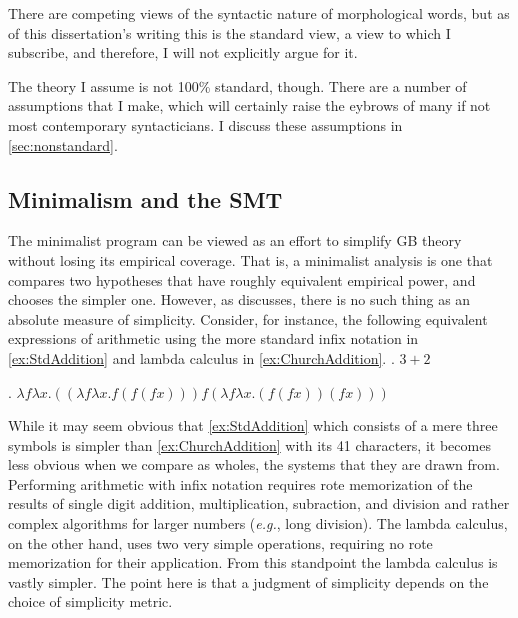 \documentclass[MilwayThesis]{subfiles}
\begin{document}
There are competing views of the syntactic nature of morphological words, but as of this dissertation's writing this is the standard view, a view to which I subscribe, and therefore, I will not explicitly argue for it.

The theory I assume is not 100\% standard, though.
There are a number of assumptions that I make, which will certainly raise the eybrows of many if not most contemporary syntacticians.
I discuss these assumptions in \cref{sec:nonstandard}.

\subsection{Minimalism and the SMT}
The minimalist program can be viewed as an effort to simplify GB theory without losing its empirical coverage.
That is, a minimalist analysis is one that compares two hypotheses that have roughly equivalent empirical power, and chooses the simpler one.
However, as \textcite{chomsky1965aspects} discusses, there is no such thing as an absolute measure of simplicity.
Consider, for instance, the following equivalent expressions of arithmetic using the more standard infix notation in \cref{ex:StdAddition} and lambda calculus in \cref{ex:ChurchAddition}.
\ex.\label{ex:StdAddition} $3 + 2$

\ex.\label{ex:ChurchAddition} $\lambda f \lambda x . ((\lambda f \lambda x . f(f(f x))) f(\lambda f \lambda x . (f(f x))(f x)))$

While it may seem obvious that \cref{ex:StdAddition} which consists of a mere three symbols is simpler than \cref{ex:ChurchAddition} with its 41 characters, it becomes less obvious when we compare as wholes, the systems that they are drawn from.
Performing arithmetic with infix notation requires rote memorization of the results of single digit addition, multiplication, subraction, and division and rather complex algorithms for larger numbers (\textit{e.g.}, long division).
The lambda calculus, on the other hand, uses two very simple operations, requiring no rote memorization for their application.
From this standpoint the lambda calculus is vastly simpler.
The point here is that a judgment of simplicity depends on the choice of simplicity metric.
\end{document}
